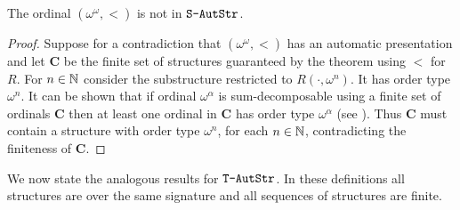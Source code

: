 \begin{corollary}  \label{AS:cor:omom}
The ordinal $(\omega^\omega,<)$ is not in $\mbox{\tt S-AutStr}$.
\end{corollary}

\begin{proof}
Suppose for a contradiction that $(\omega^\omega,<)$ has an automatic presentation and let $\mathbf{C}$ be the finite set of structures
guaranteed by the theorem using $<$ for $R$. For $n \in \mathbb{N}$ consider the substructure restricted to $R(\cdot,\omega^n)$. It has order type $\omega^n$.
It can be shown that if ordinal $\omega^\alpha$ is sum-decomposable using a finite set of ordinals $\mathbf{C}$ then at least one ordinal in $\mathbf{C}$ has order type $\omega^\alpha$ (see \cite{Delh06}).
Thus $\mathbf{C}$ must contain a structure with order type $\omega^n$, for each $n \in \mathbb{N}$, contradicting the finiteness of $\mathbf{C}$. 
\end{proof}


We now state the analogous results for $\mbox{\tt T-AutStr}$. In these definitions all structures are over the same signature and all sequences of structures are finite.

%
%


